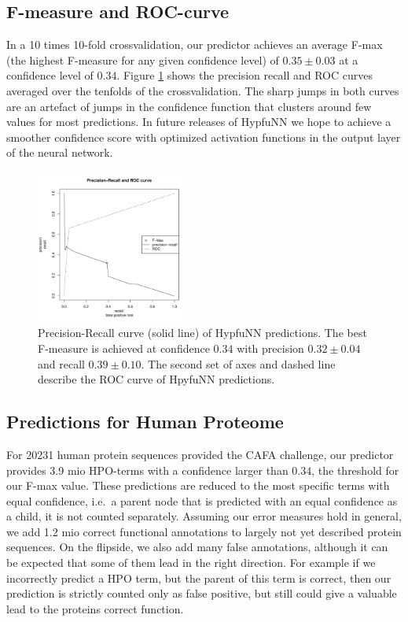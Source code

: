 \subsection*{F-measure and ROC-curve}
In a 10 times 10-fold crossvalidation, our predictor achieves an average F-max (the highest F-measure for any given confidence level) of $0.35\pm 0.03$ at a confidence level of $0.34$. Figure \ref{img:preRec_ROC} shows the precision recall and ROC curves averaged over the tenfolds of the crossvalidation. The sharp jumps in both curves are an artefact of jumps in the confidence function that clusters around few values for most predictions. In future releases of HypfuNN we hope to achieve a smoother confidence score with optimized activation functions in the output layer of the neural network.

\begin{figure}[!h]
\includegraphics[width=0.45\textwidth]{figures/PreRecROC.pdf}
\caption{Precision-Recall curve (solid line) of HypfuNN predictions. The best F-measure is achieved at confidence $0.34$ with precision $0.32 \pm 0.04$ and recall $0.39 \pm 0.10$. The second set of axes and dashed line describe the ROC curve of HpyfuNN predictions.}
\label{img:preRec_ROC}
\end{figure}

\subsection*{Predictions for Human Proteome}

For 20231 human protein sequences provided the CAFA challenge, our predictor provides 3.9 mio HPO-terms with a confidence larger than $0.34$, the threshold for our F-max value. These predictions are reduced to the most specific terms with equal confidence, i.e.~a parent node that is predicted with an equal confidence as a child, it is not counted separately. Assuming our error measures hold in general, we add 1.2 mio correct functional annotations to largely not yet described protein sequences. On the flipside, we also add many false annotations, although it can be expected that some of them lead in the right direction. For example if we incorrectly predict a HPO term, but the parent of this term is correct, then our prediction is strictly counted only as false positive, but still could give a valuable lead to the proteins correct function.